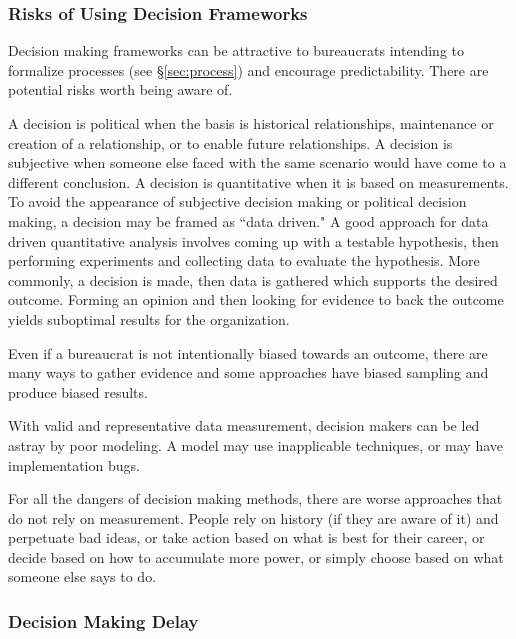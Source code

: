 \subsubsection{Risks of Using Decision Frameworks}

Decision making frameworks can be attractive to bureaucrats intending to formalize processes (see \S\ref{sec:process}) and encourage predictability. There are potential risks worth being aware of. 

A decision is political when the basis is historical relationships, maintenance or creation of a relationship, or to enable future relationships. A decision is subjective when someone else faced with the same scenario would have come to a different conclusion.
A decision is quantitative when it is based on measurements. To avoid the appearance of subjective decision making or political decision making, a decision may be framed as ``data driven." 
A good approach for data driven quantitative analysis involves coming up with a testable hypothesis, then performing experiments and collecting data to evaluate the hypothesis. More commonly, a decision is made, then data is gathered which supports the desired outcome. Forming an opinion and then looking for evidence to back the outcome yields suboptimal results for the organization.

Even if a bureaucrat is not intentionally biased towards an outcome, there are many ways to gather evidence and some approaches have biased sampling and produce biased results.

With valid and representative data measurement, decision makers can be led astray by poor modeling. A model may use inapplicable techniques, or may have implementation bugs.

For all the dangers of decision making methods, there are worse approaches that do not rely on measurement. People rely on history (if they are aware of it) and perpetuate bad ideas, or take action based on what is best for their career, or decide based on how to accumulate more power, or simply choose based on what someone else says to do.  


\subsubsection{Decision Making Delay}

